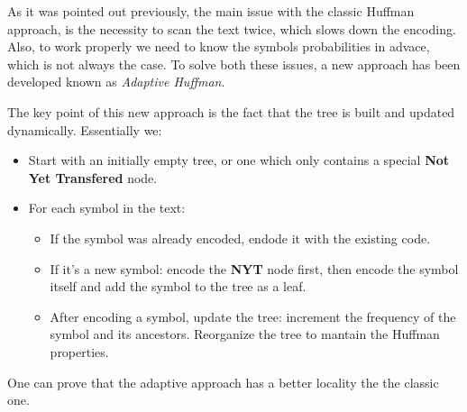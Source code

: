 \documentclass{subfiles}
\begin{document}
    As it was pointed out previously, 
        the main issue with the classic Huffman approach,
        is the necessity to scan the text twice,
        which slows down the encoding.
    Also, to work properly we need to know the symbols probabilities in advace,
        which is not always the case.
    To solve both these issues, a new approach has been developed known as 
        \emph{Adaptive Huffman}.

    The key point of this new approach is the fact that the tree is built and updated dynamically.
    Essentially we:
    \begin{itemize}
        \item Start with an initially empty tree,
            or one which only contains a special \textbf{Not Yet Transfered} node.
        \item For each symbol in the text: 
            \begin{itemize}
                \item If the symbol was already encoded, 
                    endode it with the existing code.
                \item If it's a new symbol:
                    encode the \textbf{NYT} node first, 
                    then encode the symbol itself and add the symbol to the tree as a leaf.
                \item After encoding a symbol, update the tree:
                    increment the frequency of the symbol and its ancestors.
                    Reorganize the tree to mantain the Huffman properties.
            \end{itemize}
    \end{itemize}

    One can prove that the adaptive approach has a better locality the the classic one.
\end{document}
